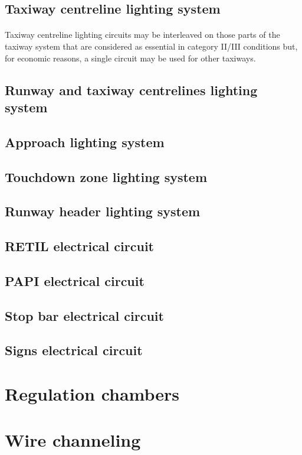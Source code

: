 		
		\subsection{Taxiway centreline lighting system}
		\paragraph{} Taxiway centreline lighting circuits may be interleaved on those parts of the taxiway system that are considered as essential in category II/III conditions but, for economic reasons, a single circuit may be used for other taxiways.
		
		
		
		\subsection{Runway and taxiway centrelines lighting system}
		
		\subsection{Approach lighting system}
		
		\subsection{Touchdown zone lighting system}
		
		\subsection{Runway header lighting system}
		
		\subsection{RETIL electrical circuit}
		
		\subsection{PAPI electrical circuit}
		
		\subsection{Stop bar electrical circuit}
		
		\subsection{Signs electrical circuit}
		
	\section{Regulation chambers}
	
	\section{Wire channeling}
	
